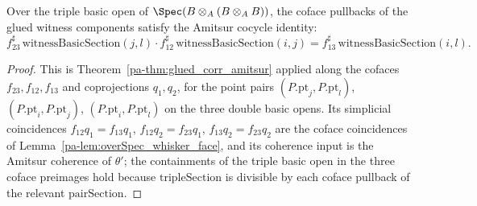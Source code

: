 \begin{theorem}
  \label{pa-thm:witnessBasicSection_amitsur}
  \leanok

  Over the triple basic open of \(\Spec(B \otimes_A (B \otimes_A B))\), the coface pullbacks of
  the glued witness components satisfy the Amitsur cocycle identity:
  \[
    f_{23}^{\sharp}\,\mathrm{witnessBasicSection}(j, l) \cdot
      f_{12}^{\sharp}\,\mathrm{witnessBasicSection}(i, j)
      = f_{13}^{\sharp}\,\mathrm{witnessBasicSection}(i, l) .
  \]
\end{theorem}
\begin{proof}
  \leanok
  This is Theorem~\ref{pa-thm:glued_corr_amitsur} applied along the cofaces \(f_{23}, f_{12},
  f_{13}\) and coprojections \(q_1, q_2\), for the point pairs
  \((P.\mathrm{pt}_j, P.\mathrm{pt}_l)\), \((P.\mathrm{pt}_i, P.\mathrm{pt}_j)\),
  \((P.\mathrm{pt}_i, P.\mathrm{pt}_l)\) on the three double basic opens. Its simplicial
  coincidences \(f_{12} q_1 = f_{13} q_1\), \(f_{12} q_2 = f_{23} q_1\), \(f_{13} q_2 = f_{23}
  q_2\) are the coface coincidences of Lemma~\ref{pa-lem:overSpec_whisker_face}, and its coherence
  input is the Amitsur coherence of \(\theta'\); the containments of the triple basic open in
  the three coface preimages hold because \(\mathrm{tripleSection}\) is divisible by each coface
  pullback of the relevant \(\mathrm{pairSection}\).
\end{proof}

